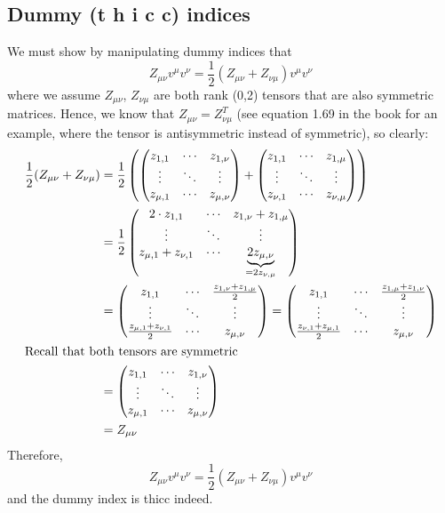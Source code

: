 \documentclass{article}
\begin{document}
		\subsection{Dummy (\textbf{t h i c c}) indices}
			We must show by manipulating dummy indices that
			$$ Z_{\mu\nu}v^\mu v^\nu = \frac12 \left(Z_{\mu\nu}+Z_{\nu\mu} \right)v^\mu v^\nu$$
			where we assume $Z_{\mu\nu}$, $Z_{\nu\mu}$ are both rank (0,2) tensors that are also symmetric matrices. Hence, we know that $Z_{\mu\nu} = Z_{\nu\mu}^T$ (see equation 1.69 in the book for an example, where the tensor is antisymmetric instead of symmetric), so clearly:
			\begin{align*}
				\frac{1}{2} (Z_{\mu\nu} + Z_{\nu\mu})  &= \frac12 \left(
				\begin{pmatrix}
					z_{1, 1} & \cdots &  z_{1, \nu} \\
					\vdots 	&	\ddots &	\vdots \\
					z_{\mu, 1} & \cdots & z_{\mu, \nu}
				\end{pmatrix}
				+ \begin{pmatrix}
					z_{1, 1} & \cdots &  z_{1, \mu} \\
					\vdots 	&	\ddots &	\vdots \\
					z_{\nu, 1} & \cdots & z_{\nu, \mu}
				\end{pmatrix} \right) \\
				&= \frac12 
				\begin{pmatrix}
					2\cdot z_{1, 1} & \cdots &  z_{1, \nu}+z_{1, \mu} \\
					\vdots 	&	\ddots &	\vdots \\
					z_{\mu, 1}+z_{\nu,1} & \cdots & \underbrace{2 z_{\mu, \nu}}_{=2z_{\nu, \mu}}
				\end{pmatrix}\\
				 &= \begin{pmatrix}
				 	z_{1, 1} & \cdots &  \frac{z_{1, \nu}+z_{1, \mu}}{2} \\
				 	\vdots 	&	\ddots &	\vdots \\
				 	\frac{z_{\mu, 1}+z_{\nu,1}}{2} & \cdots &  z_{\mu, \nu}
				 \end{pmatrix} = \begin{pmatrix}
				 z_{1, 1} & \cdots &  \frac{z_{1, \mu}+z_{1, \nu}}{2} \\
				 \vdots 	&	\ddots &	\vdots \\
				 \frac{z_{\nu, 1}+z_{\mu,1}}{2} & \cdots &  z_{\mu, \nu}
				 \end{pmatrix} \\
		 		\intertext{Recall that both tensors are symmetric}
			 	&= \begin{pmatrix}
			 		z_{1, 1} & \cdots &  z_{1, \nu} \\
			 		\vdots 	&	\ddots &	\vdots \\
			 		z_{\mu, 1} & \cdots & z_{\mu, \nu}
			 	\end{pmatrix}\\
		 		&= Z_{\mu\nu}
			\end{align*}
			Therefore,
			$$ Z_{\mu\nu}v^\mu v^\nu = \frac12 \left(Z_{\mu\nu}+Z_{\nu\mu} \right)v^\mu v^\nu$$
			and the dummy index is thicc indeed.
			
\end{document}
